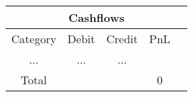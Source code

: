 \begin{longtable}{|c|c|c|c|c|}
\hline
\multicolumn{5}{|c|}{Cashflows} \\
\hline
Category & Debit & Credit & PnL \\
\hline
 ... & ... & ...\\
\hline
 Total &  &  & 0 \\
\hline
\end{longtable}
